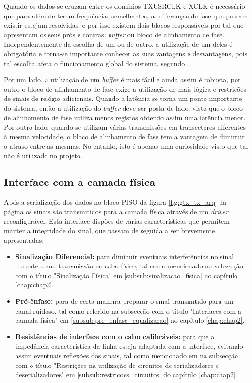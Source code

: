 Quando os dados se cruzam entre os domínios TXUSRCLK e XCLK é necessário que para além de terem frequências semelhantes, as diferenças de fase que possam existir estejam resolvidas, e por isso existem dois blocos responsáveis por tal que apresentam os seus prós e contras: \textit{buffer} ou bloco de alinhamento de fase. Independentemente da escolha de um ou de outro, a utilização de um deles é obrigatória e torna-se importante conhecer as suas vantagens e desvantagens, pois tal escolha afeta o funcionamento global do sistema, segundo \cite{R011}.

Por um lado, a utilização de um \textit{buffer} é mais fácil e ainda assim é robusta, por outro o bloco de alinhamento de fase exige a utilização de mais lógica e restrições de sinais de relógio adicionais. Quando a latência se torna um ponto importante do sistema, então a utilização do \textit{buffer} deve ser posta de lado, visto que o bloco de alinhamento de fase utiliza menos registos obtendo assim uma latência menor. Por outro lado, quando se utilizam várias transmissões em transcetores diferentes à mesma velocidade, o bloco de alinhamento de fase tem a vantagem de diminuir o atraso entre as mesmas. No entanto, isto é apenas uma curiosidade visto que tal não é utilizado no projeto.

\subsection{Interface com a camada física} 
Após a serialização dos dados no bloco PISO da figura \ref{fig:gtx_tx_arq} da página \pageref{fig:gtx_tx_arq} os sinais são transmitidos para a camada física através de um \textit{driver} reconfigurável. Esta interface dispões de várias características que permitem manter a integridade do sinal, que passam de seguida a ser brevemente apresentadas:
\begin{itemize}
	\item \textbf{Sinalização Diferencial:} para diminuir eventuais interferências no sinal durante a sua transmissão no cabo físico, tal como mencionado na subsecção com o título "Sinalização Física" em \ref{subsub:sinalizacao_fisica} no capítulo \ref{chap:chap2}.
	\item \textbf{Pré-ênfase:} para de certa maneira preparar o sinal transmitido para um canal ruidoso, tal como referido na subsecção com o título "Interfaces com a camada física" em \ref{subsub:pre_enfase_equalizacao} no capítulo \ref{chap:chap2}.
	\item \textbf{Resistências de interface com o cabo calibráveis:} para que a impedância característica da linha esteja adaptada com a interface, evitando assim eventuais reflexões dos sinais, tal como mencionado em na subsecção com o título "Restrições na utilização de circuitos de serializadores e deserializadores" em \ref{subsub:restricoes_circuitos} do capítulo \ref{chap:chap2}.
\end{itemize}


